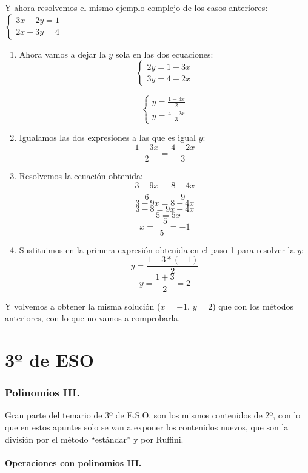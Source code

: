 \documentclass[a4paper,11pt,answers]{exam}
\begin{document}
  Y ahora resolvemos el mismo ejemplo complejo de los casos anteriores:
  $\begin{cases}
     3x+2y = 1\\
     2x+3y = 4
   \end{cases}$
   \begin{solution}
     \begin{enumerate}
     \item Ahora vamos a dejar la $y$ sola en las dos ecuaciones:
       \[
         \begin{cases}
           2y = 1-3x\\
           3y = 4 - 2x
         \end{cases}
       \]

       \[
         \begin{cases}
           y = \frac{1-3x}{2}\\
           y = \frac{4 - 2x}{3}
         \end{cases}
       \]
     \item Igualamos las dos expresiones a las que es igual $y$:
       \[\frac{1-3x}{2} = \frac{4 - 2x}{3}\]

     \item Resolvemos la ecuación obtenida:
       \[\frac{3-9x}{6} = \frac{8-4x}{9}\]
       \[3-9x = 8-4x\]
       \[3-8 = 9x - 4x\]
       \[-5 = 5x\]
       \[x = \frac{-5}{5} = -1\]

     \item Sustituimos en la primera expresión obtenida en el paso 1 para resolver la $y$:
       \[y = \frac{1 - 3*(-1)}{2}\]
       \[y = \frac{1+3}{2} = 2\]
     \end{enumerate}
     Y volvemos a obtener la misma solución ($x=-1$, $y=2$) que con los métodos anteriores, con lo que no vamos a comprobarla.
   \end{solution}

 \part{3º de ESO}
   \section{Polinomios III.}
   Gran parte del temario de 3º de E.S.O. son los mismos contenidos de 2º, con lo que en estos apuntes solo se van a exponer los contenidos nuevos, que son la división por el método ``estándar'' y por Ruffini.
   \subsection{Operaciones con polinomios III.}
\end{document}

